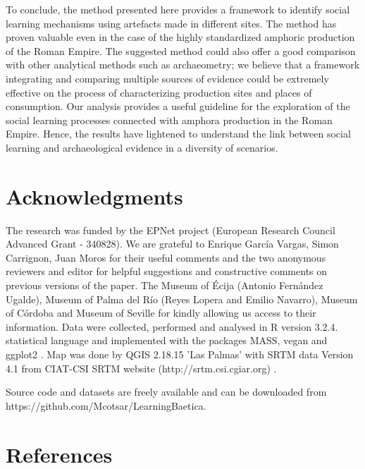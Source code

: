 \documentclass[review]{elsarticle}
\begin{document}
To conclude, the method presented here provides a framework to identify social learning mechanisms using artefacts made in different sites. The method has proven valuable even in the case of the highly standardized amphoric production of the Roman Empire. The suggested method could also offer a good comparison with other analytical methods such as archaeometry; we believe that a framework integrating and comparing multiple sources of evidence could be extremely effective on the process of characterizing production sites and places of consumption. Our analysis provides a useful guideline for the exploration of the social learning processes connected with amphora production in the Roman Empire. Hence, the results have lightened to understand the link between social learning and archaeological evidence in a diversity of scenarios. 
 

\section{Acknowledgments}

The research was funded by the EPNet project (European Research Council Advanced Grant - 340828). We are grateful to Enrique Garc\'ia Vargas, Simon Carrignon, Juan Moros for their useful comments and the two anonymous reviewers and editor for helpful suggestions and constructive comments on previous versions of the paper. The Museum of \'Ecija (Antonio Fern\'andez Ugalde), Museum of Palma del R\'io (Reyes Lopera and Emilio Navarro), Museum of C\'ordoba and Museum of Seville for kindly allowing us access to their information. Data were collected, performed and analysed in R version 3.2.4. statistical language and implemented with the packages MASS, vegan and ggplot2 \citep{ripley_package_2013,oksanen_vegan_2007,ggplot2:_2016}. Map was done by QGIS 2.18.15 'Las Palmas' with SRTM data Version 4.1 from CIAT-CSI SRTM website (http://srtm.csi.cgiar.org) \citep{SRTM}. 

Source code and datasets are freely available and can be downloaded from https://github.com/Mcotsar/LearningBaetica.  

\section*{References}


\end{document}
